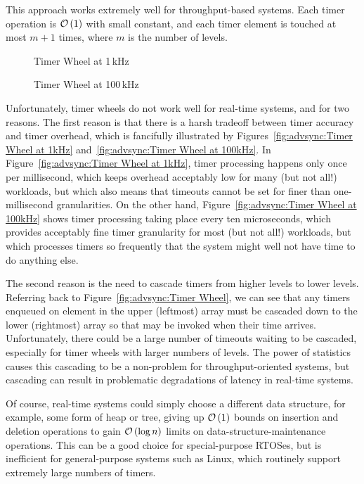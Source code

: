 This approach works extremely well for throughput-based systems.
Each timer operation is $\mathcal{O}\left(1\right)$ with small constant, and each timer
element is touched at most $m+1$ times, where $m$ is the number of
levels.

\begin{figure}[tb]
\centering
{}
\caption{Timer Wheel at 1\,kHz}
\end{figure}

\begin{figure}[tb]
\centering
{}
\caption{Timer Wheel at 100\,kHz}
\end{figure}

Unfortunately, timer wheels do not work well for real-time systems, and for
two reasons.
The first reason is that there is a harsh tradeoff between timer
accuracy and timer overhead, which is fancifully illustrated by
Figures~\ref{fig:advsync:Timer Wheel at 1kHz}
and~\ref{fig:advsync:Timer Wheel at 100kHz}.
In
Figure~\ref{fig:advsync:Timer Wheel at 1kHz},
timer processing happens only once per millisecond, which keeps overhead
acceptably low for many (but not all!) workloads, but which also means
that timeouts cannot be set for finer than one-millisecond granularities.
On the other hand,
Figure~\ref{fig:advsync:Timer Wheel at 100kHz}
shows timer processing taking place every ten microseconds, which
provides acceptably fine timer granularity for most (but not all!)
workloads, but which processes timers so frequently that the system
might well not have time to do anything else.

The second reason is the need to cascade timers from higher levels to
lower levels.
Referring back to
Figure~\ref{fig:advsync:Timer Wheel},
we can see that any timers enqueued on element  in the upper
(leftmost) array must be cascaded down to the lower (rightmost)
array so that may be invoked when their time arrives.
Unfortunately, there could be a large number of timeouts
waiting to be cascaded, especially for timer wheels with larger numbers
of levels.
The power of statistics causes this cascading to be a non-problem for
throughput-oriented systems, but cascading can result in problematic
degradations of latency in real-time systems.

Of course, real-time systems could simply choose a different data
structure, for example, some form of heap or tree, giving up
$\mathcal{O}\left(1\right)$ bounds on insertion and deletion operations to gain $\mathcal{O}\left(\log n\right)$
limits on data-structure-maintenance operations.
This can be a good choice for special-purpose RTOSes, but is inefficient
for general-purpose systems such as Linux, which routinely support
extremely large numbers of timers.

